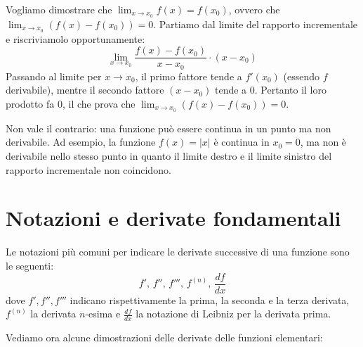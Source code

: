 \documentclass[12pt]{report}
\begin{document}
	\begin{dimostrazione}{}{}
		
		Vogliamo dimostrare che $\lim_{x \to x_0} f(x) = f(x_0)$, ovvero che $\lim_{x \to x_0} (f(x) - f(x_0)) = 0$.
		Partiamo dal limite del rapporto incrementale e riscriviamolo opportunamente:
		\[
		\lim_{x \to x_0} \frac{f(x) - f(x_0)}{x - x_0} \cdot (x - x_0)
		\]
		Passando al limite per $x \to x_0$, il primo fattore tende a $f'(x_0)$ (essendo $f$ derivabile), mentre il secondo fattore $(x - x_0)$ tende a $0$. Pertanto il loro prodotto fa $0$, il che prova che $\lim_{x \to x_0} (f(x) - f(x_0)) = 0$.
		
	\end{dimostrazione}
	
	\begin{osservazione}{}{}
		
		Non vale il contrario: una funzione può essere continua in un punto ma non derivabile. Ad esempio, la funzione $f(x) = |x|$ è continua in $x_0 = 0$, ma non è derivabile nello stesso punto in quanto il limite destro e il limite sinistro del rapporto incrementale non coincidono.
		
	\end{osservazione}
	
	\section{Notazioni e derivate fondamentali}
	
	Le notazioni più comuni per indicare le derivate successive di una funzione sono le seguenti:
	\[
	f', \, f'', \, f''', \, f^{(n)}, \, \frac{df}{dx}
	\]
	dove $f', f'', f'''$ indicano rispettivamente la prima, la seconda e la terza derivata, $f^{(n)}$ la derivata $n$-esima e $\frac{df}{dx}$ la notazione di Leibniz per la derivata prima.
	
	Vediamo ora alcune dimostrazioni delle derivate delle funzioni elementari:
	
\end{document}
